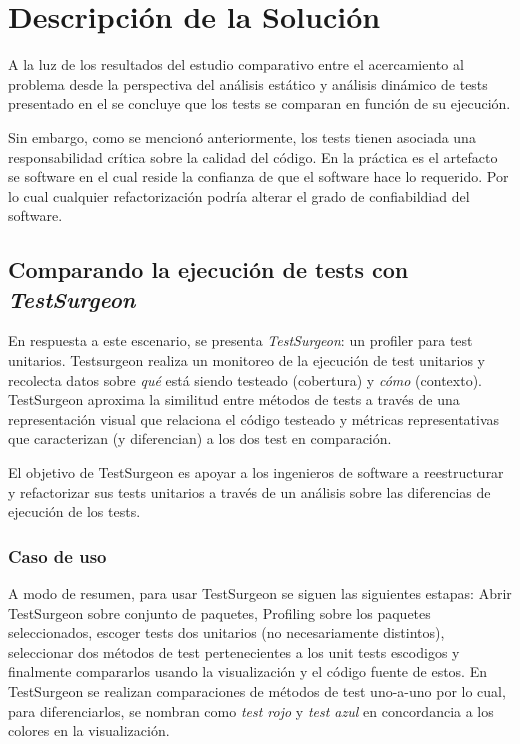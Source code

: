 \chapter{Descripción de la Solución}


\par A la luz de los resultados del estudio comparativo entre el acercamiento al problema desde la perspectiva del análisis estático y análisis dinámico de  tests presentado en el  se concluye que los tests se comparan en función de su ejecución. 

\par Sin embargo, como se mencionó anteriormente, los tests tienen asociada una responsabilidad crítica sobre la calidad del código. En la práctica es el artefacto se software en el cual reside la confianza de que el software hace lo requerido. Por lo cual cualquier refactorización podría alterar el grado de confiabildiad del software.


\section{Comparando la ejecución de tests con \emph{TestSurgeon}}

\par En respuesta a este escenario, se presenta \emph{TestSurgeon}: un profiler para test unitarios. Testsurgeon realiza un monitoreo de la ejecución de test unitarios y recolecta datos sobre \emph{qué} está siendo testeado (cobertura) y \emph{cómo} (contexto). TestSurgeon aproxima la similitud entre métodos de tests a través de una representación visual que relaciona el código testeado y métricas representativas que caracterizan (y diferencian) a los dos test en comparación. 

\par El objetivo de TestSurgeon es apoyar a los ingenieros de software a reestructurar y refactorizar sus tests unitarios a través de un análisis sobre las diferencias de ejecución de los tests.

\subsection{Caso de uso}
\par A modo de resumen, para usar TestSurgeon se siguen las siguientes estapas: Abrir TestSurgeon sobre conjunto de paquetes, Profiling sobre los paquetes seleccionados, escoger tests dos unitarios (no necesariamente distintos), seleccionar dos métodos de test pertenecientes a los unit tests escodigos y finalmente compararlos usando la visualización y el código fuente de estos. En TestSurgeon se realizan comparaciones de métodos de test uno-a-uno por lo cual, para diferenciarlos, se nombran como \emph{test rojo} y \emph{test azul} en concordancia a los colores en la visualización.

